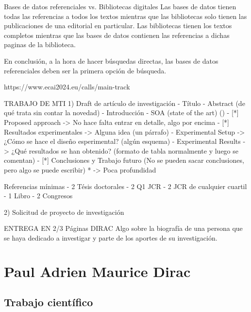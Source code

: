 Bases de datos referenciales vs. Bibliotecas digitales
Las bases de datos tienen todas las referencias a todos los textos mientras que las bibliotecas solo tienen las publicaciones de una editorial en particular.
Las bibliotecas tienen los textos completos mientras que las bases de datos contienen las referencias a dichas paginas de la biblioteca.

En conclusión, a la hora de hacer búsquedas directas, las bases de datos referenciales deben ser la primera opción de búsqueda.



https://www.ecai2024.eu/calls/main-track



TRABAJO DE MTI
1) Draft de artículo de investigación
    - Título
    - Abstract (de qué trata sin contar la novedad)
    - Introducción
    - SOA (state of the art) ()
    - [*] Proposed approach -> No hace falta entrar en detalle, algo por encima
    - [*] Resultados experimentales -> Alguna idea (un párrafo)
            - Experimental Setup -> ¿Cómo se hace el diseño esperimental? (algún esquema)
            - Experimental Results -> ¿Qué resultados se han obtenido? (formato de tabla normalmente y luego se comentan)
    - [*] Conclusiones y Trabajo futuro (No se pueden sacar conclusiones, pero algo se puede escribir)
* -> Poca profundidad

Referencias mínimas
    - 2 Tésis doctorales
    - 2 Q1 JCR
    - 2 JCR de cualquier cuartil
    - 1 Libro
    - 2 Congresos


2) Solicitud de proyecto de investigación




ENTREGA EN 2/3 Páginas
DIRAC
Algo sobre la biografía de una persona que se haya dedicado a investigar y parte de los aportes de su investigación.

\section{Paul Adrien Maurice Dirac}


\subsection{Trabajo científico}



